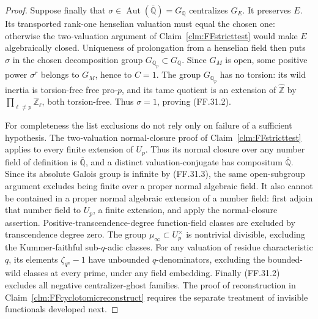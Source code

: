 \begin{proof}
Suppose finally that
\(\sigma\in\operatorname{Aut}(\overline{\mathbb Q})
=G_{\mathbb Q}\) centralizes \(G_E\).
It preserves \(E\). Its transported rank-one
henselian valuation must equal the chosen one:
otherwise the two-valuation argument of
Claim~\ref{clm:FFstricttest} would make \(E\)
algebraically closed. Uniqueness of prolongation
from a henselian field then puts \(\sigma\)
in the chosen decomposition group
\(G_{\mathbb Q_p}\subset G_{\mathbb Q}\).
Since \(G_M\) is open, some positive power
\(\sigma^r\) belongs to \(G_M\), hence to
\(C=1\). The group \(G_{\mathbb Q_p}\) has
no torsion: its wild inertia is torsion-free
free pro-\(p\), and its tame quotient is an
extension of \(\widehat{\mathbb Z}\) by
\(\prod_{\ell\ne p}\mathbb Z_\ell\), both
torsion-free. Thus \(\sigma=1\), proving
(FF.31.2).

For completeness the list exclusions do not
rely only on failure of a sufficient hypothesis.
The two-valuation normal-closure proof of
Claim~\ref{clm:FFstricttest} applies to every
finite extension of \(U_p\). Thus its normal
closure over any number field of definition
is \(\overline{\mathbb Q}\), and a distinct
valuation-conjugate has compositum
\(\overline{\mathbb Q}\). Since its absolute
Galois group is infinite by (FF.31.3), the same
open-subgroup argument excludes being finite
over a proper normal algebraic field. It also
cannot be contained in a proper normal algebraic
extension of a number field: first adjoin that
number field to \(U_p\), a finite extension,
and apply the normal-closure assertion.
Positive-transcendence-degree function-field
classes are excluded by transcendence degree
zero. The group \(\mu_\infty\subset U_p^\times\)
is nontrivial divisible, excluding the
Kummer-faithful sub-\(q\)-adic classes. For
any valuation of residue characteristic \(q\),
its elements \(\zeta_{q^n}-1\) have unbounded
\(q\)-denominators, excluding the bounded-wild
classes at every prime, under any field embedding.
Finally (FF.31.2) excludes all negative
centralizer-ghost families. The proof of
reconstruction in Claim~\ref{clm:FFcyclotomicreconstruct}
requires the separate treatment of invisible
functionals developed next.
\end{proof}

